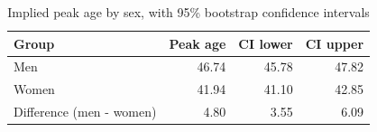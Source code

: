 \begin{table}[H]
\centering
\caption{\label{tab:peak_age_sex}Implied peak age by sex, with 95\% bootstrap confidence intervals}
\centering
\begin{tabular}[t]{lrrr}
\toprule
Group & Peak age & CI lower & CI upper\\
\midrule
Men & 46.74 & 45.78 & 47.82\\
Women & 41.94 & 41.10 & 42.85\\
Difference (men - women) & 4.80 & 3.55 & 6.09\\
\bottomrule
\end{tabular}
\end{table}
